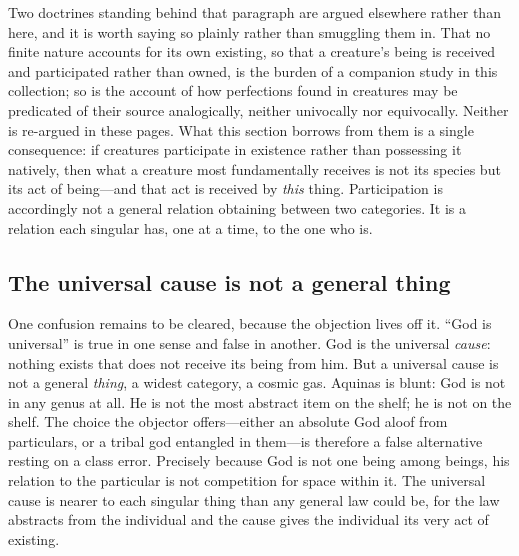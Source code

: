 Two doctrines standing behind that paragraph are argued elsewhere rather than here, and it is worth saying so plainly rather than smuggling them in. That no finite nature accounts for its own existing, so that a creature's being is received and participated rather than owned, is the burden of a companion study in this collection; so is the account of how perfections found in creatures may be predicated of their source analogically, neither univocally nor equivocally. Neither is re-argued in these pages. What this section borrows from them is a single consequence: if creatures participate in existence rather than possessing it natively, then what a creature most fundamentally receives is not its species but its act of being---and that act is received by \emph{this} thing. Participation is accordingly not a general relation obtaining between two categories. It is a relation each singular has, one at a time, to the one who is.

\subsection{The universal cause is not a general thing}

One confusion remains to be cleared, because the objection lives off it. ``God is universal'' is true in one sense and false in another. God is the universal \emph{cause}: nothing exists that does not receive its being from him. But a universal cause is not a general \emph{thing}, a widest category, a cosmic gas. Aquinas is blunt: God is not in any genus at all. He is not the most abstract item on the shelf; he is not on the shelf. The choice the objector offers---either an absolute God aloof from particulars, or a tribal god entangled in them---is therefore a false alternative resting on a class error. Precisely because God is not one being among beings, his relation to the particular is not competition for space within it. The universal cause is nearer to each singular thing than any general law could be, for the law abstracts from the individual and the cause gives the individual its very act of existing.

